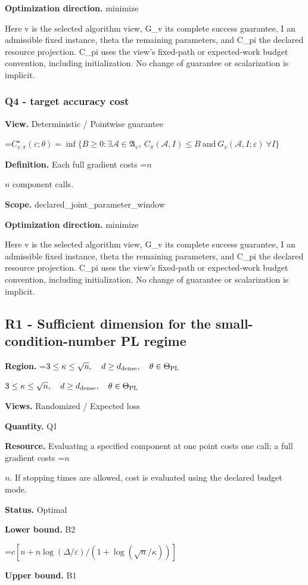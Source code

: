 \documentclass[10pt,a4paper]{article}
\newcommand{\AtlasMath}[1]{\par\begingroup\centering\setbox0=\hbox{$\displaystyle #1$}\ifdim\wd0>1.4\linewidth\typeout{ATLAS WIDE FORMULA: \the\wd0}\fi\ifdim\wd0>\linewidth\resizebox{\linewidth}{!}{\box0}\else\box0\fi\par\endgroup}
\newcommand{\AtlasInlineMath}[1]{\begingroup\setbox0=\hbox{$#1$}\ifdim\wd0>.4\linewidth\endgroup\AtlasMath{#1}\else\endgroup$#1$\fi}
\begin{document}
\textbf{Optimization direction.} minimize

Here v is the selected algorithm view, G\_v its complete success guarantee, I an admissible fixed instance, theta the remaining parameters, and C\_pi the declared resource projection. C\_pi uses the view's fixed-path or expected-work budget convention, including initialization. No change of guarantee or scalarization is implicit.

\subsubsection{Q4 - target accuracy cost}
\textbf{View.} Deterministic / Pointwise guarantee

\AtlasMath{C^\star_{v,\pi}(\varepsilon;\theta)=\inf\{B\ge0:\exists\mathcal A\in\mathfrak A_v,\ C_\pi(\mathcal A,I)\le B\ \text{and}\ G_v(\mathcal A,I;\varepsilon)\ \forall I\}}
\textbf{Definition.} Each full gradient costs \AtlasInlineMath{n} component calls.

\textbf{Scope.} declared\_joint\_parameter\_window

\textbf{Optimization direction.} minimize

Here v is the selected algorithm view, G\_v its complete success guarantee, I an admissible fixed instance, theta the remaining parameters, and C\_pi the declared resource projection. C\_pi uses the view's fixed-path or expected-work budget convention, including initialization. No change of guarantee or scalarization is implicit.

\subsection{R1 - Sufficient dimension for the small-condition-number PL regime}
\textbf{Region.} \AtlasInlineMath{3\le\kappa\le\sqrt n,\quad d\ge d_{\rm dense},\quad\theta\in\Theta_{\rm PL}}

\textbf{Views.} Randomized / Expected loss

\textbf{Quantity.} Q1

\textbf{Resource.} Evaluating a specified component at one point costs one call; a full gradient costs \AtlasInlineMath{n}. If stopping times are allowed, cost is evaluated using the declared budget mode.

\textbf{Status.} Optimal

\textbf{Lower bound.} B2

\AtlasMath{c[n+n\log(\Delta/\varepsilon)/(1+\log(\sqrt n/\kappa))]}
\textbf{Upper bound.} B1
\end{document}
